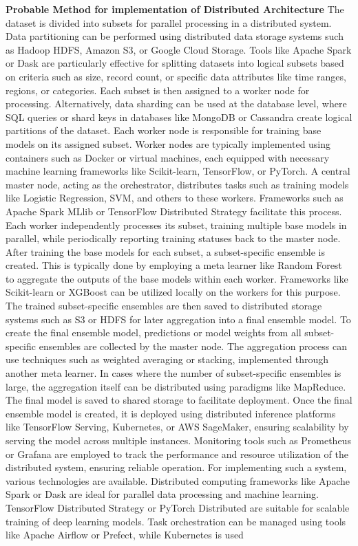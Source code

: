 \vspace{1em}

\noindent
\textbf{Probable Method for implementation of Distributed Architecture}
\newline
\noindent
The dataset is divided into subsets for parallel processing in a distributed system. Data partitioning can be performed using distributed data storage systems such as Hadoop HDFS, Amazon S3, or Google Cloud Storage. Tools like Apache Spark or Dask are particularly effective for splitting datasets into logical subsets based on criteria such as size, record count, or specific data attributes like time ranges, regions, or categories. Each subset is then assigned to a worker node for processing. Alternatively, data sharding can be used at the database level, where SQL queries or shard keys in databases like MongoDB or Cassandra create logical partitions of the dataset. Each worker node is responsible for training base models on its assigned subset. Worker nodes are typically implemented using containers such as Docker or virtual machines, each equipped with necessary machine learning frameworks like Scikit-learn, TensorFlow, or PyTorch. A central master node, acting as the orchestrator, distributes tasks such as training models like Logistic Regression, SVM, and others to these workers. Frameworks such as Apache Spark MLlib or TensorFlow Distributed Strategy facilitate this process. Each worker independently processes its subset, training multiple base models in parallel, while periodically reporting training statuses back to the master node. After training the base models for each subset, a subset-specific ensemble is created. This is typically done by employing a meta learner like Random Forest to aggregate the outputs of the base models within each worker. Frameworks like Scikit-learn or XGBoost can be utilized locally on the workers for this purpose. The trained subset-specific ensembles are then saved to distributed storage systems such as S3 or HDFS for later aggregation into a final ensemble model. To create the final ensemble model, predictions or model weights from all subset-specific ensembles are collected by the master node. The aggregation process can use techniques such as weighted averaging or stacking, implemented through another meta learner. In cases where the number of subset-specific ensembles is large, the aggregation itself can be distributed using paradigms like MapReduce. The final model is saved to shared storage to facilitate deployment. Once the final ensemble model is created, it is deployed using distributed inference platforms like TensorFlow Serving, Kubernetes, or AWS SageMaker, ensuring scalability by serving the model across multiple instances. Monitoring tools such as Prometheus or Grafana are employed to track the performance and resource utilization of the distributed system, ensuring reliable operation. For implementing such a system, various technologies are available. Distributed computing frameworks like Apache Spark or Dask are ideal for parallel data processing and machine learning. TensorFlow Distributed Strategy or PyTorch Distributed are suitable for scalable training of deep learning models. Task orchestration can be managed using tools like Apache Airflow or Prefect, while Kubernetes is used 